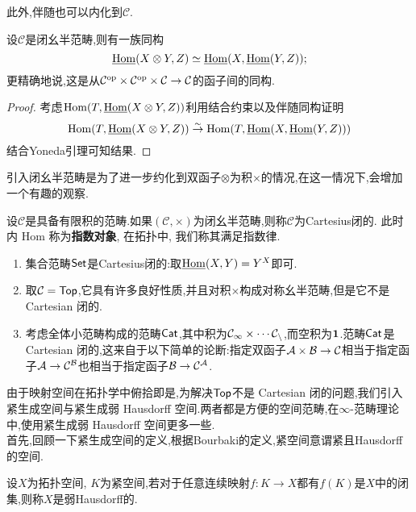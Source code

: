 此外,伴随也可以内化到$\mathcal{C}$.
\begin{proposition}
    设$\mathcal{C}$是闭幺半范畴,则有一族同构
    \[
    \underline{\operatorname{Hom}}(X\otimes Y,Z)\simeq \underline{\operatorname{Hom}}(X,\underline{\operatorname{Hom}}(Y,Z));
    \]
    更精确地说,这是从$\mathcal{C}^{\operatorname{op}}\times \mathcal{C}^{\operatorname{op}}\times \mathcal{C} \to \mathcal{C}$的函子间的同构.
\end{proposition}
\begin{proof}
    考虑$\operatorname{Hom}(T,\underline{\operatorname{Hom}}(X\otimes Y,Z))$利用结合约束以及伴随同构证明
    \[\operatorname{Hom}(T,\underline{\operatorname{Hom}}(X\otimes Y,Z))\stackrel{\sim}{\rightarrow} \operatorname{Hom}(T,\underline{\operatorname{Hom}}(X,\underline{\operatorname{Hom}}(Y,Z)))
    \]
    结合Yoneda引理可知结果.
\end{proof}
引入闭幺半范畴是为了进一步约化到双函子$\otimes$为积$\times$的情况,在这一情况下,会增加一个有趣的观察.
\begin{definition}[Cartesius闭]\label{定义:Cartesian闭}
    设$\mathcal{C}$是具备有限积的范畴.如果$(\mathcal{C},\times)$为闭幺半范畴,则称$\mathcal{C}$为Cartesius闭的. 此时内 Hom 称为\textbf{指数对象}, 在拓扑中, 我们称其满足指数律.
\end{definition}
\begin{example}
\begin{enumerate}
    \item 集合范畴$\mathsf{Set}$是Cartesius闭的:取$\underline{\operatorname{Hom}}(X,Y) = Y^X$即可.
    \item 取$\mathcal{C} = \mathsf{Top}$,它具有许多良好性质,并且对积$\times$构成对称幺半范畴,但是它不是 Cartesian 闭的.
    \item 考虑全体小范畴构成的范畴$\mathsf{Cat}$,其中积为$\cal{C}_1\times \cdots \cal{C}_n$,而空积为$\bold{1}$.范畴$\mathsf{Cat}$是 Cartesian 闭的,这来自于以下简单的论断:指定双函子$\cal{A} \times \cal{B} \to \cal{C}$相当于指定函子$\cal{A} \to \cal{C}^{\cal{B}}$也相当于指定函子$\cal{B} \to \cal{C}^{\cal{A}}$.
\end{enumerate}
\end{example}
由于映射空间在拓扑学中俯拾即是,为解决$\mathsf{Top}$不是 Cartesian 闭的问题,我们引入紧生成空间与紧生成弱 Hausdorff 空间.两者都是方便的空间范畴,在$\infty$-范畴理论中,使用紧生成弱 Hausdorff 空间更多一些.\\
首先,回顾一下紧生成空间的定义,根据Bourbaki的定义,紧空间意谓紧且Hausdorff的空间.
\begin{definition}[弱Hausdorff]\label{定义:弱Hausdorff}
    设$X$为拓扑空间, $K$为紧空间,若对于任意连续映射$f: K \to X$都有$f(K)$是$X$中的闭集,则称$X$是弱Hausdorff的.
\end{definition}
